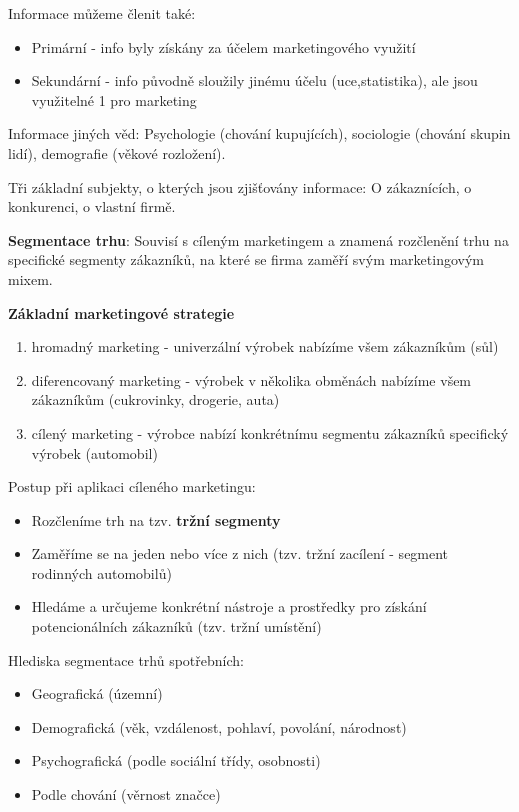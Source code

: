 Informace můžeme členit také:
\begin{itemize}
    \item Primární - info byly získány za účelem marketingového využití
    \item Sekundární - info původně sloužily jinému účelu (uce,statistika), ale jsou využitelné 1 pro marketing
\end{itemize}

Informace jiných věd:
Psychologie (chování kupujících), sociologie (chování skupin lidí), demografie (věkové rozložení).

Tři základní subjekty, o kterých jsou zjišťovány informace:
O zákaznících, o konkurenci, o vlastní firmě.

\textbf{Segmentace trhu}:
Souvisí s cíleným marketingem a znamená rozčlenění trhu na specifické segmenty zákazníků, na které se firma zaměří svým marketingovým mixem.

\textbf{Základní marketingové strategie}
\begin{enumerate}
    \item hromadný marketing - univerzální výrobek nabízíme všem zákazníkům (sůl)
    \item diferencovaný marketing - výrobek v několika obměnách nabízíme všem zákazníkům (cukrovinky, drogerie, auta)
    \item cílený marketing - výrobce nabízí konkrétnímu segmentu zákazníků specifický výrobek (automobil)
\end{enumerate}

Postup při aplikaci cíleného marketingu:
\begin{itemize}
    \item Rozčleníme trh na tzv. \textbf{tržní segmenty}
    \item Zaměříme se na jeden nebo více z nich (tzv. tržní zacílení - segment rodinných automobilů)
    \item Hledáme a určujeme konkrétní nástroje a prostředky pro získání potencionálních zákazníků (tzv. tržní umístění)
\end{itemize}

Hlediska segmentace trhů spotřebních:
\begin{itemize}
    \item Geografická (územní)
    \item Demografická (věk, vzdálenost, pohlaví, povolání, národnost)
    \item Psychografická (podle sociální třídy, osobnosti)
    \item Podle chování (věrnost značce)
\end{itemize}

